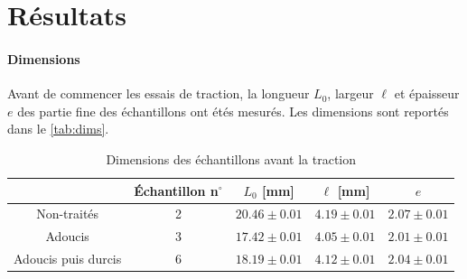 \section{Résultats}

\paragraph{Dimensions} Avant de commencer les essais de traction, la longueur \(L_0\), largeur \(\ell\) et épaisseur \(e\) des partie fine des échantillons ont étés mesurés. Les dimensions sont reportés dans le \autoref{tab:dims}.

\begin{table}[h]
    \centering
    \begin{tabular}{ |c||c|c|c|c| }
        \cline{2-5}
        \multicolumn{1}{c|}{} & Échantillon n$^\circ$ & \(L_0\) [mm] & \(\ell\) [mm] & \(e\) \\
        \hline
        \multirow{1}{4cm}{Non-traités}
        & 2 & \(20.46 \pm 0.01\) & \(4.19 \pm 0.01\) & \(2.07 \pm 0.01\) \\
        \hline
        \multirow{1}{4cm}{Adoucis}
        & 3 & \(17.42 \pm 0.01\) & \(4.05 \pm 0.01\) & \(2.01 \pm 0.01\) \\
        \hline
        \multirow{1}{4cm}{Adoucis puis durcis}
        & 6 & \(18.19 \pm 0.01\) & \(4.12 \pm 0.01\) & \(2.04 \pm 0.01\) \\
        \hline
    \end{tabular}
    \caption{Dimensions des échantillons avant la traction}
    \label{tab:dims}
\end{table}

